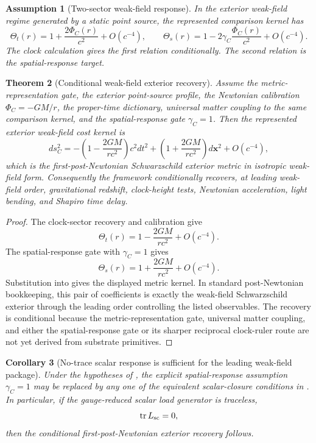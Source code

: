 \documentclass[11pt]{article}
\newtheorem{theorem}{Theorem}[section]
\newtheorem{corollary}[theorem]{Corollary}
\newtheorem{assumption}[theorem]{Assumption}
\theoremstyle{remark}
\begin{document}
\begin{assumption}[Two-sector weak-field response]
\label{ass:two-sector-response}
In the exterior weak-field regime generated by a static point source, the represented comparison kernel has
\[
        \Theta_t(r)=1+\frac{2\Phi_C(r)}{c^2}+O(c^{-4}),
        \qquad
        \Theta_s(r)=1-2\gamma_C\frac{\Phi_C(r)}{c^2}+O(c^{-4}).
\]
The clock calculation gives the first relation conditionally.  The second relation is the spatial-response target.
\end{assumption}

\begin{theorem}[Conditional weak-field exterior recovery]
\label{thm:conditional-weak-field}
Assume the metric-representation gate, the exterior point-source profile, the Newtonian calibration \(\Phi_C=-GM/r\), the proper-time dictionary, universal matter coupling to the same comparison kernel, and the spatial-response gate \(\gamma_C=1\).  Then the represented exterior weak-field cost kernel is
\[
        ds_C^2
        =-\left(1-\frac{2GM}{rc^2}\right)c^2dt^2
        +\left(1+\frac{2GM}{rc^2}\right)d\mathbf x^2
        +O(c^{-4}),
\]
which is the first-post-Newtonian Schwarzschild exterior metric in isotropic weak-field form.  Consequently the framework conditionally recovers, at leading weak-field order, gravitational redshift, clock-height tests, Newtonian acceleration, light bending, and Shapiro time delay.
\end{theorem}

\begin{proof}
The clock-sector recovery and calibration give
\[
        \Theta_t(r)=1-\frac{2GM}{rc^2}+O(c^{-4}).
\]
The spatial-response gate with \(\gamma_C=1\) gives
\[
        \Theta_s(r)=1+\frac{2GM}{rc^2}+O(c^{-4}).
\]
Substitution into  gives the displayed metric kernel.  In standard post-Newtonian bookkeeping, this pair of coefficients is exactly the weak-field Schwarzschild exterior through the leading order controlling the listed observables.  The recovery is conditional because the metric-representation gate, universal matter coupling, and either the spatial-response gate or its sharper reciprocal clock-ruler route are not yet derived from substrate primitives.
\end{proof}


\begin{corollary}[No-trace scalar response is sufficient for the leading weak-field package]
\label{cor:no-trace-suffices-weak-field}
Under the hypotheses of , the explicit spatial-response assumption \(\gamma_C=1\) may be replaced by any one of the equivalent scalar-closure conditions in .  In particular, if the gauge-reduced scalar load generator is traceless,
\[
        \operatorname{tr}L_{\rm sc}=0,
\]
then the conditional first-post-Newtonian exterior recovery follows.
\end{corollary}
\end{document}
